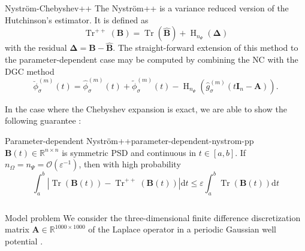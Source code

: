 \documentclass[final, 12pt]{beamer}
\newcommand{\mtx}[1]{\boldsymbol{#1}}
\newcommand{\vct}[1]{\boldsymbol{#1}}
\DeclareMathOperator{\Tr}{Tr}
\DeclareMathOperator{\Hutch}{H}
\begin{document}
\begin{frame}[t]
\begin{columns}[t]
\begin{column}{0.3\paperwidth}
        \begin{block}{Nystr\"om-Chebyshev++}
            The Nystr\"om++ is a variance reduced version
            of the Hutchinson's estimator. It is defined as
            \begin{equation}
                \Tr^{++}(\mtx{B}) = \Tr(\widehat{\mtx{B}}) + \Hutch_{n_{\Psi}}(\mtx{\Delta})
            \end{equation}
            with the residual $\mtx{\Delta} = \mtx{B} - \widehat{\mtx{B}}$.
            The straight-forward extension of this method to the
            parameter-dependent case may be computed by combining the \gls{NC} with the \gls{DGC} method
            \begin{equation}
                \boxed{\breve{\phi}_{\sigma}^{(m)}(t) = \widehat{\phi}_{\sigma}^{(m)}(t) + \widetilde{\phi}_{\sigma}^{(m)}(t) - \Hutch_{n_{\Psi}}(\widehat{g}_{\sigma}^{(m)}(t\mtx{I}_n - \mtx{A})).}
            \end{equation}
        \end{block}
        In the case where the Chebyshev expansion is exact,
        we are able to show the following guarantee \cite{he2023parameter}:
        \begin{thm}{Parameter-dependent Nystr\"om++}{parameter-dependent-nystrom-pp}
            $\mtx{B}(t) \in \mathbb{R}^{n \times n}$ is symmetric \gls{PSD}
            and continuous in $t \in [a, b]$. If $n_{\Omega} = n_{\Psi} = \mathcal{O}\left( \varepsilon^{-1} \right)$,
            then with high probability
            \begin{equation}
                \int_{a}^{b} |\Tr(\mtx{B}(t)) - \Tr^{++}(\mtx{B}(t))| \mathrm{d}t \leq \varepsilon \int_{a}^{b}\Tr(\mtx{B}(t)) \mathrm{d}t
            \end{equation}
        \end{thm}

    \end{column}

\end{columns}


\vspace{5pt}
\begin{columns}[t]

    \begin{column}{0.45\paperwidth}

        \begin{block}{Model problem}
            We consider the three-dimensional finite difference discretization matrix
            $\mtx{A} \in \mathbb{R}^{1000 \times 1000}$ of
            the Laplace operator in a periodic Gaussian well potential \cite{lin2017randomized}.
            

\end{block}
\end{column}
\end{columns}
\end{frame}
\end{document}
